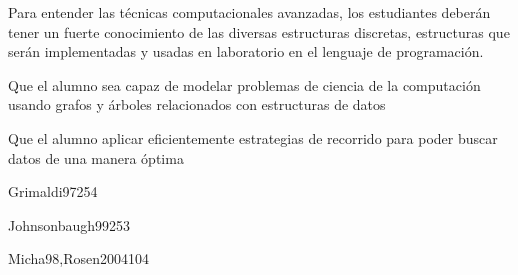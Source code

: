 \begin{syllabus}


\begin{justification}
Para entender las técnicas computacionales avanzadas, los estudiantes deberán tener un fuerte conocimiento de las
diversas estructuras discretas, estructuras que serán implementadas y usadas en laboratorio en el lenguaje de programación.
\end{justification}

\begin{goals}
\item Que el alumno sea capaz de modelar problemas de ciencia de la computación usando grafos y árboles relacionados con estructuras de datos
\item Que el alumno aplicar eficientemente estrategias de recorrido para poder buscar datos de una manera óptima
\end{goals}

\begin{outcomes}
\end{outcomes}

\begin{unit}{\DSBasicCountingDef}{Grimaldi97}{25}{4}
   \DSBasicCountingAllTopics
   \DSBasicCountingAllObjectives
\end{unit}

\begin{unit}{\DSGraphsAndTreesDef}{Johnsonbaugh99}{25}{3}
   \DSGraphsAndTreesAllTopics
   \DSGraphsAndTreesAllObjectives
\end{unit}

\begin{unit}{\DSDiscreteProbabilityDef}{Micha98,Rosen2004}{10}{4}
   \DSDiscreteProbabilityAllTopics
   \DSDiscreteProbabilityAllObjectives
\end{unit}



\begin{coursebibliography}
\end{coursebibliography}

\end{syllabus}

%

